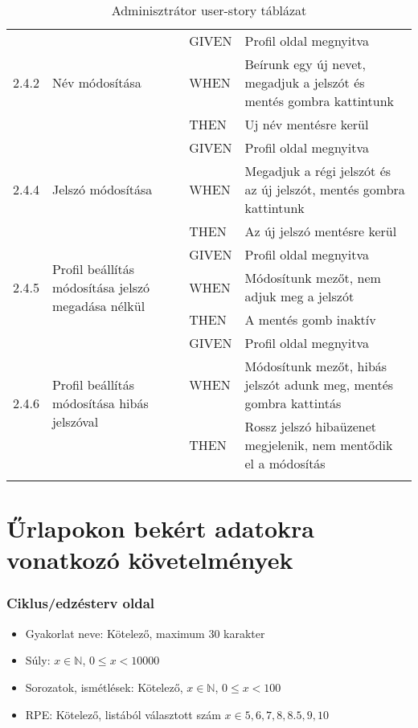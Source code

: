 \begin{center}
\begin{longtable}{ | p{} | p{} | p{} | p{} | }
			\multirow{3}{*}{2.4.2} 
			& \multirow{3}{=}{Név módosítása} 
			& GIVEN 
			& Profil oldal megnyitva \\
			\cline{3-4}
			& & WHEN 
			& Beírunk egy új nevet, megadjuk a jelszót és mentés gombra kattintunk \\
			\cline{3-4}
			& & THEN 
			& Uj név mentésre kerül \\
			\hline

			\multirow{3}{*}{2.4.4} 
			& \multirow{3}{=}{Jelszó módosítása} 
			& GIVEN 
			& Profil oldal megnyitva \\
			\cline{3-4}
			& & WHEN 
			& Megadjuk a régi jelszót és az új jelszót, mentés gombra kattintunk \\
			\cline{3-4}
			& & THEN 
			& Az új jelszó mentésre kerül \\
			\hline

			\multirow{3}{*}{2.4.5} 
			& \multirow{3}{=}{Profil beállítás módosítása jelszó megadása nélkül} 
			& GIVEN 
			& Profil oldal megnyitva \\
			\cline{3-4}
			& & WHEN 
			& Módosítunk mezőt, nem adjuk meg a jelszót \\
			\cline{3-4}
			& & THEN 
			& A mentés gomb inaktív \\
			\hline

			\multirow{3}{*}{2.4.6} 
			& \multirow{3}{=}{Profil beállítás módosítása hibás jelszóval} 
			& GIVEN 
			& Profil oldal megnyitva \\
			\cline{3-4}
			& & WHEN 
			& Módosítunk mezőt, hibás jelszót adunk meg, mentés gombra kattintás \\
			\cline{3-4}
			& & THEN 
			& Rossz jelszó hibaüzenet megjelenik, nem mentődik el a módosítás \\
			\hline

			\caption{Adminisztrátor user-story táblázat}
			\label{tab:userstoryadmin}       
	\end{longtable}
\end{center}

\section{Űrlapokon bekért adatokra vonatkozó követelmények}

\subsubsection{Ciklus/edzésterv oldal}

\begin{itemize}
	\item Gyakorlat neve: Kötelező, maximum 30 karakter
	\item Súly: $x \in \mathbb{N}$, $0 \leq x < 10000$
	\item Sorozatok, ismétlések: Kötelező, $x \in \mathbb{N}$, $0 \leq x < 100$
	\item RPE: Kötelező, listából választott szám $x \in {5, 6, 7, 8, 8.5, 9, 10}$
\end{itemize}

